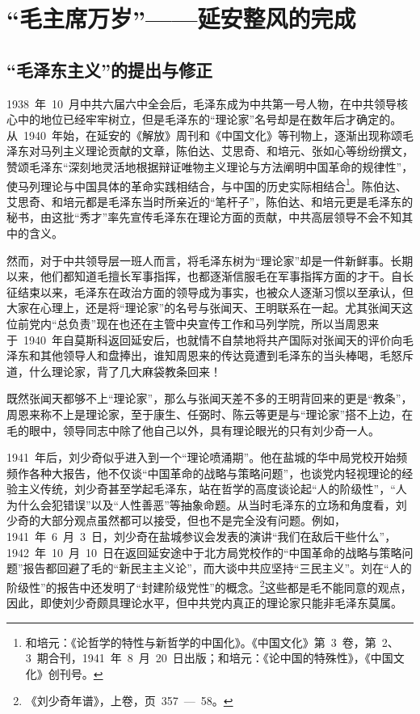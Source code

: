 
\chapter{“毛主席万岁”——延安整风的完成}

\section{“毛泽东主义”的提出与修正}

1938~年~10~月中共六届六中全会后，毛泽东成为中共第一号人物，在中共领导核心中的地位已经牢牢树立，但是毛泽东的“理论家”名号却是在数年后才确定的。从~1940~年始，在延安的《解放》周刊和《中国文化》等刊物上，逐渐出现称颂毛泽东对马列主义理论贡献的文章，陈伯达、艾思奇、和培元、张如心等纷纷撰文，赞颂毛泽东“深刻地灵活地根据辩证唯物主义理论与方法阐明中国革命的规律性”，使马列理论与中国具体的革命实践相结合，与中国的历史实际相结合\footnote{和培元：《论哲学的特性与新哲学的中国化》。《中国文化》第~3~卷，第~2、3~期合刊，1941~年~8~月~20~日出版；和培元：《论中国的特殊性》，《中国文化》创刊号。}。陈伯达、艾思奇、和培元都是毛泽东当时所亲近的“笔杆子”，陈伯达、和培元更是毛泽东的秘书，由这批“秀才”率先宣传毛泽东在理论方面的贡献，中共高层领导不会不知其中的含义。

然而，对于中共领导层一班人而言，将毛泽东树为“理论家”却是一件新鲜事。长期以来，他们都知道毛擅长军事指挥，也都逐渐信服毛在军事指挥方面的才干。自长征结束以来，毛泽东在政治方面的领导成为事实，也被众人逐渐习惯以至承认，但大家在心理上，还是将“理论家”的名号与张闻天、王明联系在一起。尤其张闻天这位前党内“总负责”现在也还在主管中央宣传工作和马列学院，所以当周恩来于~1940~年自莫斯科返回延安后，也就情不自禁地将共产国际对张闻天的评价向毛泽东和其他领导人和盘捧出，谁知周恩来的传达竟遭到毛泽东的当头棒喝，毛怒斥道，什么理论家，背了几大麻袋教条回来！

既然张闻天都够不上“理论家”，那么与张闻天差不多的王明背回来的更是“教条”，周恩来称不上是理论家，至于康生、任弼时、陈云等更是与“理论家”搭不上边，在毛的眼中，领导同志中除了他自己以外，具有理论眼光的只有刘少奇一人。

1941~年后，刘少奇似乎进入到一个“理论喷涌期”。他在盐城的华中局党校开始频频作各种大报告，他不仅谈“中国革命的战略与策略问题”，也谈党内轻视理论的经验主义传统，刘少奇甚至学起毛泽东，站在哲学的高度谈论起“人的阶级性”，“人为什么会犯错误”以及“人性善恶”等抽象命题。从当时毛泽东的立场和角度看，刘少奇的大部分观点虽然都可以接受，但也不是完全没有问题。例如，1941~年~6~月~3~日，刘少奇在盐城参议会发表的演讲“我们在敌后干些什么”，1942~年~10~月~10~日在返回延安途中于北方局党校作的“中国革命的战略与策略问题”报告都回避了毛的“新民主主义论”，而大谈中共应坚持“三民主义”。刘在“人的阶级性”的报告中还发明了“封建阶级党性”的概念。\footnote{《刘少奇年谱》，上卷，页~357~—~58。}这些都是毛不能同意的观点，因此，即使刘少奇颇具理论水平，但中共党内真正的理论家只能非毛泽东莫属。

